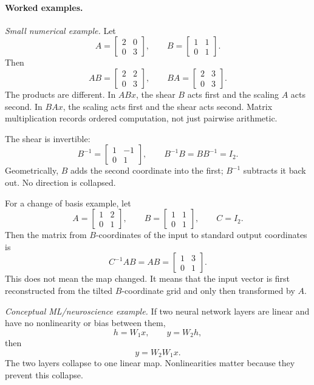 \paragraph{Worked examples.}
\emph{Small numerical example.} Let
\[
A=\begin{bmatrix}2&0\\0&3\end{bmatrix},
\qquad
B=\begin{bmatrix}1&1\\0&1\end{bmatrix}.
\]
Then
\[
AB=
\begin{bmatrix}2&2\\0&3\end{bmatrix},
\qquad
BA=
\begin{bmatrix}2&3\\0&3\end{bmatrix}.
\]
The products are different. In \(ABx\), the shear \(B\) acts first and the scaling \(A\) acts second. In \(BAx\), the scaling acts first and the shear acts second. Matrix multiplication records ordered computation, not just pairwise arithmetic.

The shear is invertible:
\[
B^{-1}=
\begin{bmatrix}1&-1\\0&1\end{bmatrix},
\qquad
B^{-1}B=BB^{-1}=I_2.
\]
Geometrically, \(B\) adds the second coordinate into the first; \(B^{-1}\) subtracts it back out. No direction is collapsed.

For a change of basis example, let
\[
A=\begin{bmatrix}1&2\\0&1\end{bmatrix},
\qquad
B=
\begin{bmatrix}1&1\\0&1\end{bmatrix},
\qquad
C=I_2.
\]
Then the matrix from \(B\)-coordinates of the input to standard output coordinates is
\[
C^{-1}AB=AB
=
\begin{bmatrix}1&3\\0&1\end{bmatrix}.
\]
This does not mean the map changed. It means that the input vector is first reconstructed from the tilted \(B\)-coordinate grid and only then transformed by \(A\).

\emph{Conceptual ML/neuroscience example.} If two neural network layers are linear and have no nonlinearity or bias between them,
\[
h=W_1x,\qquad y=W_2h,
\]
then
\[
y=W_2W_1x.
\]
The two layers collapse to one linear map. Nonlinearities matter because they prevent this collapse.


